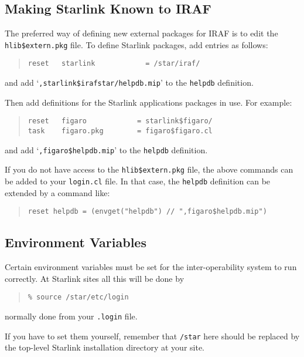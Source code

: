 \documentclass[twoside,11pt]{article}
\newcommand{\xlabel}[1]{}
\begin{document}
\subsection{\xlabel{making_starlink_known_to_iraf}Making Starlink Known to IRAF}
The preferred way of defining new external packages for IRAF is to edit
the \texttt{hlib\$extern.pkg} file. To define Starlink packages, add entries as 
follows:
\begin{quote} \begin{verbatim}
reset   starlink            = /star/iraf/
\end{verbatim} \end{quote}
and add `{\texttt{,starlink\$irafstar/helpdb.mip}}' to the \texttt{helpdb} 
definition.

Then add definitions for the Starlink applications packages in use. 
For example:
\begin{quote} \begin{verbatim}
reset   figaro            = starlink$figaro/
task    figaro.pkg        = figaro$figaro.cl
\end{verbatim} \end{quote}
and add `{\texttt{,figaro\$helpdb.mip}}' to the \texttt{helpdb} definition.

If you do not have access to the \texttt{hlib\$extern.pkg} file, the above 
commands can be added to your \texttt{login.cl} file. In that case, the
\texttt{helpdb} definition can be extended by a command like:
\begin{quote} \begin{verbatim}
reset helpdb = (envget("helpdb") // ",figaro$helpdb.mip")
\end{verbatim} \end{quote}

\subsection{\xlabel{environment_variables}Environment Variables}
Certain environment variables must be set for the inter-operability system to 
run correctly. At Starlink sites all this will be done by 
\begin{quote} \begin{verbatim}
% source /star/etc/login
\end{verbatim} \end{quote}
normally done from your \texttt{.login} file.

If you have to set them yourself, remember that \texttt{/star} here should be 
replaced by the top-level Starlink installation directory at your site.
\end{document}
